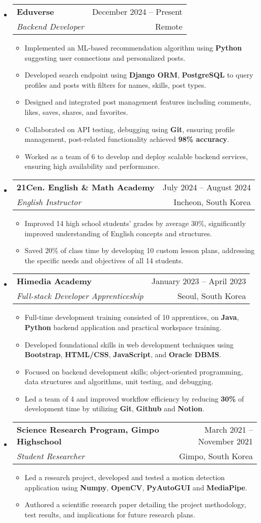 \documentclass[letterpaper,11pt]{article}
\makeatletter
\newcommand{\resumeItem}[1]{
  \item\small{
    {#1 \vspace{-3pt}}
  }
}
\newcommand{\resumeSubheading}[4]{
    \item
    \begin{tabular*}{0.97\textwidth}[t]{l@{\extracolsep{\fill}}r@{\hspace{-0.2in}}}
        \small{\textbf{#1}} & \small{#2} \\
        \textit{\small#3} & \small #4 \\
    \end{tabular*}\vspace{-7pt}
}
\newcommand{\resumeSubHeadingListStart}{\begin{itemize}[leftmargin=0.00in, rightmargin=-0.2in, label={}]}
\newcommand{\resumeSubHeadingListEnd}{\end{itemize}\vspace{-7pt}}
\newcommand{\resumeItemListStart}{\begin{itemize}[leftmargin=0.15in, rightmargin=0.15in]}
\newcommand{\resumeItemListEnd}{\end{itemize}\vspace{-7pt}}
\makeatother
\begin{document}
\resumeSubHeadingListStart
\resumeSubheading
{Eduverse}{December 2024 -- Present}
{Backend Developer}{Remote}
\resumeItemListStart
\resumeItem{Implemented an ML-based recommendation algorithm using \textbf{Python} suggesting user connections and personalized posts.}
\resumeItem{Developed search endpoint using \textbf{Django ORM}, \textbf{PostgreSQL} to query profiles and posts with filters for names, skills, post types.}
\resumeItem{Designed and integrated post management features including comments, likes, saves, shares, and favorites.}
\resumeItem{Collaborated on API testing, debugging using \textbf{Git}, ensuring profile management, post-related functionality achieved \textbf{98\% accuracy}.}
\resumeItem{Worked as a team of 6 to develop and deploy scalable backend services, ensuring high availability and performance.}
\resumeItemListEnd
\resumeSubHeadingListEnd

\resumeSubHeadingListStart
\resumeSubheading
{21Cen. English \& Math Academy}{July 2024 -- August 2024}
{English Instructor}{Incheon, South Korea}
\resumeItemListStart
\resumeItem{Improved 14 high school students' grades by average 30\%, significantly improved understanding of English concepts and structures.}
\resumeItem{Saved 20\% of class time by developing 10 custom lesson plans, addressing the specific needs and objectives of all 14 students.}
\resumeItemListEnd
\resumeSubHeadingListEnd

\resumeSubHeadingListStart
\resumeSubheading
{Himedia Academy}{January 2023 -- April 2023}
{Full-stack Developer Apprenticeship}{Seoul, South Korea}
\resumeItemListStart
\resumeItem{Full-time development training consisted of 10 apprentices, on \textbf{Java}, \textbf{Python} backend application and practical workspace training.}
\resumeItem{Developed foundational skills in web development techniques using \textbf{Bootstrap}, \textbf{HTML/CSS}, \textbf{JavaScript}, and \textbf{Oracle DBMS}.}
\resumeItem{Focused on backend development skills; object-oriented programming, data structures and algorithms, unit testing, and debugging.}
\resumeItem{Led a team of 4 and improved workflow efficiency by reducing \textbf{30\%} of development time by utilizing \textbf{Git}, \textbf{Github} and \textbf{Notion}.}
\resumeItemListEnd
\resumeSubHeadingListEnd

\resumeSubHeadingListStart
\resumeSubheading
{Science Research Program, Gimpo Highschool}{March 2021 -- November 2021}
{Student Researcher}{Gimpo, South Korea}
\resumeItemListStart
\resumeItem{Led a research project, developed and tested a motion detection application using \textbf{Numpy}, \textbf{OpenCV}, \textbf{PyAutoGUI} and \textbf{MediaPipe}.}
\resumeItem{Authored a scientific research paper detailing the project methodology, test results, and implications for future research plans.}
\resumeItemListEnd
\resumeSubHeadingListEnd
\end{document}
